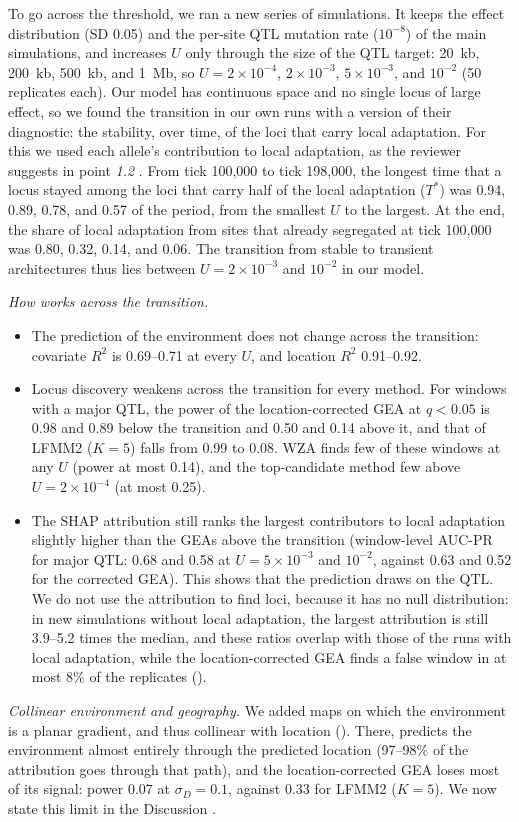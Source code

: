 {To go across the threshold, we ran a new series of simulations. It keeps
the effect distribution (SD 0.05) and the per-site QTL mutation rate
($10^{-8}$) of the main simulations, and increases $U$ only through the
size of the QTL target: 20~kb, 200~kb, 500~kb, and 1~Mb, so
$U = 2\times10^{-4}$, $2\times10^{-3}$, $5\times10^{-3}$, and $10^{-2}$ (50
replicates each). Our model has continuous space and no single locus of
large effect, so we found the transition in our own runs with a version of
their diagnostic: the stability, over time, of the loci that carry local
adaptation. For this we used each
allele's contribution to local adaptation, as the reviewer suggests in
point \textit{1.2} \citep{booker_structure_2024}. From tick
100,000 to tick 198,000, the longest time that a locus stayed among the
loci that carry half of the local adaptation ($T^*$) was 0.94, 0.89, 0.78,
and 0.57 of the period, from the smallest $U$ to the largest. At the end,
the share of local adaptation from sites that already segregated at tick
100,000 was 0.80, 0.32, 0.14, and 0.06. The transition from stable to
transient architectures thus lies between $U = 2\times10^{-3}$ and
$10^{-2}$ in our model.

\textit{How \ecolocator works across the transition.}
\begin{itemize}
\item The prediction of the environment does not change across the
  transition: covariate $R^2$ is 0.69--0.71 at every $U$, and location
  $R^2$ 0.91--0.92.
\item Locus discovery weakens across the transition for every method. For
  windows with a major QTL, the power of the location-corrected GEA at
  $q < 0.05$ is 0.98 and 0.89 below the transition and 0.50 and 0.14
  above it, and that of LFMM2 ($K = 5$) falls from 0.99 to 0.08. WZA
  finds few of these windows at any $U$ (power at most 0.14), and the
  top-candidate method few above $U = 2\times10^{-4}$ (at most 0.25).
\item The SHAP attribution still ranks the largest contributors to local
  adaptation slightly higher than the GEAs above the transition
  (window-level AUC-PR for major QTL: 0.68 and 0.58 at
  $U = 5\times10^{-3}$ and $10^{-2}$, against 0.63 and 0.52 for the
  corrected GEA). This shows that the prediction draws on the QTL. We do
  not use the attribution to find loci, because it has no null
  distribution: in new simulations without local adaptation, the largest
  attribution is still 3.9--5.2 times the median, and these ratios overlap
  with those of the runs with local adaptation, while the
  location-corrected GEA finds a false window in at most 8\% of the
  replicates ().
\end{itemize}

\textit{Collinear environment and geography.} We added maps on which the
environment is a planar gradient, and thus collinear with location
(). There, \ecolocator predicts the
environment almost entirely through the predicted location (97--98\% of
the attribution goes through that path), and the location-corrected GEA
loses most of its signal: power 0.07 at $\sigma_D = 0.1$, against 0.33
for LFMM2 ($K = 5$). We now state this limit in the Discussion
.}

